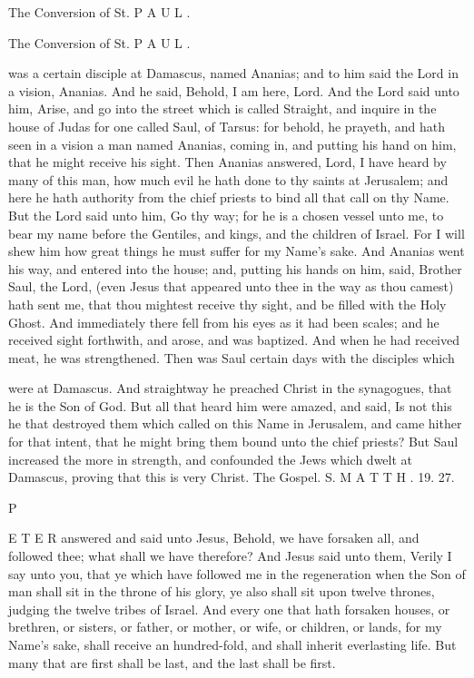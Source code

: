 The Conversion of St. P A U L .

The Conversion of St. P A U L .

was a certain disciple at Damascus, named Ananias; and to him said the Lord in a vision, Ananias. And he said, Behold, I am here, Lord. And the Lord said unto him, Arise, and go into the street which is called Straight, and inquire in the house of Judas for one called Saul, of Tarsus: for behold, he prayeth, and hath seen in a vision a man named Ananias, coming in, and putting his hand on him, that he might receive his sight. Then Ananias answered, Lord, I have heard by many of this man, how much evil he hath done to thy saints at Jerusalem; and here he hath authority from the chief priests to bind all that call on thy Name. But the Lord said unto him, Go thy way; for he is a chosen vessel unto me, to bear my name before the Gentiles, and kings, and the children of Israel. For I will shew him how great things he must suffer for my Name’s sake. And Ananias went his way, and entered into the house; and, putting his hands on him, said, Brother Saul, the Lord, (even Jesus that appeared unto thee in the way as thou camest) hath sent me, that thou mightest receive thy sight, and be filled with the Holy Ghost. And immediately there fell from his eyes as it had been scales; and he received sight forthwith, and arose, and was baptized. And when he had received meat, he was strengthened. Then was Saul certain days with the disciples which

were at Damascus. And straightway he preached Christ in the synagogues, that he is the Son of God. But all that heard him were amazed, and said, Is not this he that destroyed them which called on this Name in Jerusalem, and came hither for that intent, that he might bring them bound unto the chief priests? But Saul increased the more in strength, and confounded the Jews which dwelt at Damascus, proving that this is very Christ. The Gospel. S. M A T T H . 19. 27.

P

E T E R answered and said unto Jesus, Behold, we have forsaken all, and followed thee; what shall we have therefore? And Jesus said unto them, Verily I say unto you, that ye which have followed me in the regeneration when the Son of man shall sit in the throne of his glory, ye also shall sit upon twelve thrones, judging the twelve tribes of Israel. And every one that hath forsaken houses, or brethren, or sisters, or father, or mother, or wife, or children, or lands, for my Name’s sake, shall receive an hundred-fold, and shall inherit everlasting life. But many that are first shall be last, and the last shall be first.


